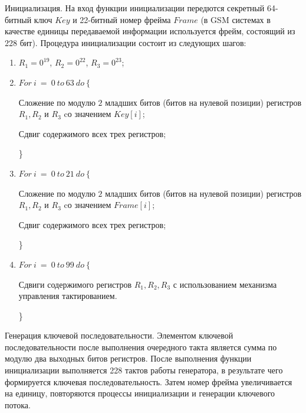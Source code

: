 \documentclass{./civarticle}
\begin{document}
Инициализация. На вход функции инициализации передются секретный 64-битный ключ $Key$ и 22-битный номер фрейма $Frame$ (в GSM системах в качестве единицы передаваемой информации используется фрейм, состоящий из 228 бит). Процедура инициализации состоит из следующих шагов: 
\begin{enumerate}
    \item $R_1 = 0^{19}$, $R_2 = 0^{22}$, $R_3 = 0^{23}$;
    \item $For~i~=~0~to~63~do~\{$
    
    \hspace{0.5cm}Сложение по модулю $2$ младших битов (битов на нулевой позиции) регистров $R_1, R_2$ и $R_3$ cо значением $Key[i]$;

    \hspace{0.5cm}Сдвиг содержимого всех трех регистров;

    \}
    \item $For~i~=~0~to~21~do~\{$

    \hspace{0.5cm}Сложение по модулю $2$ младших битов (битов на нулевой позиции) регистров $R_1, R_2$ и $R_3$ cо значением $Frame[i]$;

    \hspace{0.5cm}Сдвиг содержимого всех трех регистров;

    \}
    \item $For~i~=~0~to~99~do~\{$

    \hspace{0.5cm}Сдвиги содержимого регистров $R_1, R_2, R_3$ с использованием механизма управления тактированием.

    \}
\end{enumerate}

Генерация ключевой последовательности. Элементом ключевой последовательности после выполнения очередного такта является сумма по модулю два выходных битов регистров.
После выполнения функции инициализации выполняется 228 тактов работы генератора, в результате чего формируется ключевая последовательность. Затем номер фрейма увеличивается на единицу, повторяются процессы инициализации и генерации ключевого потока.
\end{document}
